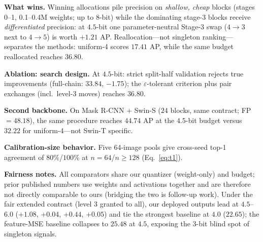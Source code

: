 \smallskip
\noindent\textbf{What wins.}
Winning allocations pile precision on \emph{shallow, cheap} blocks
(stages 0--1, 0.1--0.4M weights; up to 8-bit) while the dominating
stage-3 blocks receive \emph{differentiated} precision: at $4.5$-bit one
parameter-neutral Stage-3 swap ($4\!\to\!3$ next to $4\!\to\!5$) is worth
$+1.21$ AP. Reallocation---not singleton ranking---separates the methods:
uniform-4 scores $17.41$ AP, while the same budget reallocated reaches
$36.80$.

\smallskip
\noindent\textbf{Ablation: search design.}
At $4.5$-bit: strict split-half validation rejects true improvements
(full-chain: $33.84$, $-1.75$); the $\varepsilon$-tolerant criterion plus
pair exchanges (incl.\ level-3 moves) reaches $36.80$.

\smallskip
\noindent\textbf{Second backbone.}
On Mask R-CNN + Swin-S ($24$ blocks, same contract; FP $=48.18$), the
same procedure reaches $44.74$ AP at the $4.5$-bit budget versus $32.22$
for uniform-4---not Swin-T specific.

\smallskip
\noindent\textbf{Calibration-size behavior.}
Five 64-image pools give cross-seed top-1 agreement of
$80\%$/$100\%$ at $n{=}64$/$n\!\geq\!128$ (Eq.~\eqref{eq:t1}).

\smallskip
\noindent\textbf{Fairness notes.} All comparators share our quantizer
(weight-only) and budget; prior published numbers use weights and
activations together and are therefore not directly comparable to ours
(bridging the two is follow-up work).
Under the fair extended contract (level $3$ granted to all), our deployed
outputs lead at $4.5$--$6.0$ ($+1.08$, $+0.04$, $+0.44$, $+0.05$) and tie
the strongest baseline at $4.0$ ($22.65$); the feature-MSE baseline
collapses to $25.48$ at $4.5$, exposing the $3$-bit blind spot of
singleton signals.
